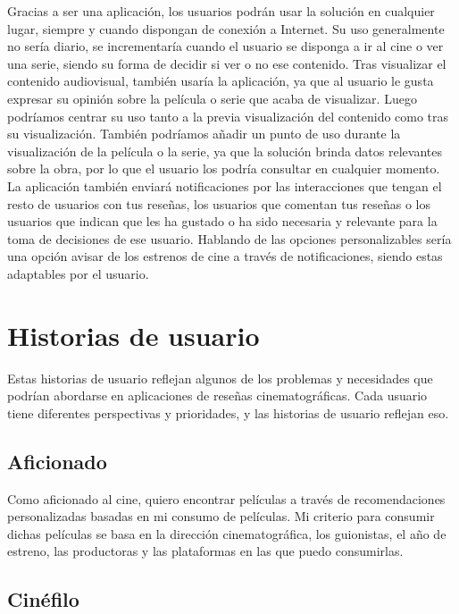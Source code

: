Gracias a ser una aplicación, los usuarios podrán usar la solución en cualquier lugar, siempre y 
cuando dispongan de conexión a Internet. Su uso generalmente no sería diario, se incrementaría cuando 
el usuario se disponga a ir al cine o ver una serie, siendo su forma de decidir si ver o no ese 
contenido. Tras visualizar el contenido audiovisual, también usaría la aplicación, ya que al usuario le 
gusta expresar su opinión sobre la película o serie que acaba de visualizar. Luego podríamos centrar su 
uso tanto a la previa visualización del contenido como tras su visualización. También podríamos añadir 
un punto de uso durante la visualización de la película o la serie, ya que la solución brinda datos 
relevantes sobre la obra, por lo que el usuario los podría consultar en cualquier momento. La 
aplicación también enviará notificaciones por las interacciones que tengan el resto de usuarios con tus 
reseñas, los usuarios que comentan tus reseñas o los usuarios que indican que les ha gustado o ha sido 
necesaria y relevante para la toma de decisiones de ese usuario. Hablando de las opciones 
personalizables sería una opción avisar de los estrenos de cine a través de notificaciones, 
siendo estas adaptables por el usuario.



\section{Historias de usuario}


Estas historias de usuario reflejan algunos de los problemas y necesidades que podrían abordarse en aplicaciones de reseñas cinematográficas. Cada usuario tiene diferentes perspectivas y prioridades, y las historias de usuario reflejan eso.

\subsection{Aficionado}

Como aficionado al cine, quiero encontrar películas a través de recomendaciones personalizadas basadas en mi consumo de películas. 
Mi criterio para consumir dichas películas se basa en la dirección cinematográfica, los guionistas, el año de estreno, las productoras 
y las plataformas en las que puedo consumirlas.

\subsection{Cinéfilo}

